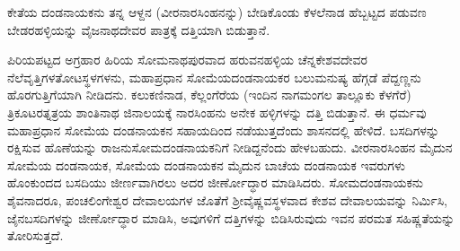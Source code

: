 \vskip 2pt

ಕೇತೆಯ ದಂಡನಾಯಕನು ತನ್ನ ಆಳ್ದನ (ವೀರನಾರಸಿಂಹನನ್ನು) ಬೇಡಿಕೊಂಡು ಕೆಳಲೆನಾಡ ಹೆಬ್ಬಟ್ಟದ ಪಡುವಣ ಬೇಡರಹಳ್ಳಿಯನ್ನು ವೈಜನಾಥದೇವರ ಪಾತ್ರಕ್ಕೆ ದತ್ತಿಯಾಗಿ ಬಿಡುತ್ತಾನೆ.

\vskip 2pt

ಪಿರಿಯಪಟ್ಟದ ಅಗ್ರಹಾರ ಹಿರಿಯ ಸೋಮನಾಥಪುರವಾದ ಹರುವನಹಳ್ಳಿಯ ಚೆನ್ನಕೇಶವದೇವರ ನೆಲೆವೃತ್ತಿಗಳ\break ತೋಟಸ್ಥಳಗಳನು, ಮಹಾಪ್ರಧಾನ ಸೋಮೆಯದಂಡನಾಯಕರ ಬಲುಮನುಷ್ಯ ಹೆಗ್ಗಡೆ ಪೆದ್ದಣ್ಣನು ಹೊರಗುತ್ತಿಗೆಯಾಗಿ ನೀಡಿದನು. ಕಲುಕಣಿನಾಡ, ಕೆಲ್ಲಂಗೆರೆಯ (ಇಂದಿನ ನಾಗಮಂಗಲ ತಾಲ್ಲೂಕು ಕೆಳಗೆರೆ) ತ್ರಿಕೂಟರತ್ನತ್ರಯ ಶಾಂತಿನಾಥ ಜಿನಾಲಯಕ್ಕೆ ನಾರಸಿಂಹನು ಅನೇಕ ಹಳ್ಳಿಗಳನ್ನು ದತ್ತಿ ಬಿಡುತ್ತಾನೆ. ಈ ಧರ್ಮವು ಮಹಾಪ್ರಧಾನ ಸೋಮೆಯ ದಂಡನಾಯಕನ ಸಹಾಯದಿಂದ ನಡೆಯುತ್ತದೆಂದು ಶಾಸನದಲ್ಲಿ ಹೇಳಿದೆ. ಬಸದಿಗಳನ್ನು ರಕ್ಷಿಸುವ ಹೊಣೆಯನ್ನು ರಾಜನು\break ಸೋಮದಂಡನಾಯಕನಿಗೆ ನೀಡಿದ್ದನೆಂದು ಹೇಳಬಹುದು. ವೀರನಾರಸಿಂಹನ ಮೈದುನ ಸೋಮೆಯ ದಂಡನಾಯಕ, ಸೋಮೆಯ ದಂಡನಾಯಕನ ಮೈದುನ ಬಾಚೆಯ ದಂಡನಾಯಕ ಇವರುಗಳು ಹೊಂಕುಂದದ ಬಸದಿಯು ಜೀರ್ಣವಾಗಿರಲು ಅದರ ಜೀರ್ಣೋದ್ಧಾರ ಮಾಡಿಸಿದರು. ಸೋಮದಂಡನಾಯಕನು ಶೈವನಾದರೂ, ಪಂಚಲಿಂಗೇಶ್ವರ ದೇವಾಲಯಗಳ ಜೊತೆಗೆ ಶ‍್ರೀವೈಷ್ಣವಸ್ಥಳವಾದ ಕೇಶವ ದೇವಾಲಯವನ್ನು ನಿರ್ಮಿಸಿ, ಜೈನಬಸದಿಗಳನ್ನು ಜೀರ್ಣೋದ್ಧಾರ ಮಾಡಿಸಿ, ಅವುಗಳಿಗೆ ದತ್ತಿಗಳನ್ನು ಬಿಡಿಸಿರುವುದು ಇವನ ಪರಮತ ಸಹಿಷ್ಣತೆಯನ್ನು ತೋರಿಸುತ್ತದೆ.

\vskip 2pt

